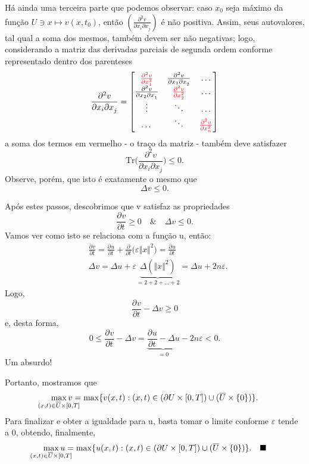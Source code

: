 \documentclass[../pde_notes.tex]{subfiles}
\begin{document}
\begin{proof*}
	Há ainda uma terceira parte que podemos observar: caso \(x_{0}\) seja máximo da função \(U\ni x\mapsto v(x, t_{0})\), então
	\(
	\left(\frac{\partial^{2}v}{\partial x_{i}\partial x_{j}^{}}\right)
	\)
	é não positiva. Assim, seus autovalores, tal qual a soma dos mesmos, também devem ser não negativas; logo, considerando a matriz das derivadas parciais de segunda ordem conforme representado dentro dos parenteses
	\[
		\frac{\partial^{2}v}{\partial x_{i}\partial x_{j}^{}} = \begin{bmatrix}
			{\color{red}\frac{\partial^{2}v}{\partial x_{1}^{2}}} & \frac{\partial^{2}v}{\partial x_{1}\partial x_{2}^{}} & \dotsc                                                \\
			\frac{\partial^{2}v}{\partial x_{2}\partial x_{1}^{}} & {\color{red}\frac{\partial^{2}v}{\partial x_{2}^{2}}} & \dotsc                                                \\
			\vdots                                                & \ddots                                                & \dotsc                                                \\
			\dotsc                                                & \ddots                                                & {\color{red}\frac{\partial^{2}v}{\partial x_{n}^{2}}}
		\end{bmatrix}
	\]
	a soma dos termos em vermelho - o traço da matriz - também deve satisfazer
	\[
		\mathrm{Tr}\biggl(\frac{\partial^{2}v}{\partial x_{i}\partial x_{j}^{}}\biggr) \leq 0.
	\]
	Observe, porém, que isto é exatamente o mesmo que
	\[
		\Delta v \leq 0.
	\]

	Após estes passos, descobrimos que v satisfaz as propriedades
	\[
		\frac{\partial^{}v}{\partial t^{}}\geq 0 \quad\&\quad \Delta v \leq 0.
	\]
	Vamos ver como isto se relaciona com a função u, então:
	\begin{align*}
		 & \frac{\partial^{}v}{\partial t^{}}=\frac{\partial^{}u}{\partial t^{}}+\frac{\partial^{}}{\partial t^{}}\bigl(\varepsilon \Vert x \Vert^{2}\bigr) = \frac{\partial^{}u}{\partial t^{}} \\
		 & \Delta v = \Delta u + \varepsilon \underbrace{\Delta \left(\Vert x \Vert^{2}\right)}_{=2+2+\dotsc +2} = \Delta u + 2n\varepsilon.
	\end{align*}
	Logo,
	\[
		\frac{\partial^{}v}{\partial t^{}}-\Delta v \geq 0
	\]
	e, desta forma,
	\[
		0\leq \frac{\partial^{}v}{\partial t^{}}-\Delta v = \underbrace{\frac{\partial^{}u}{\partial t^{}}-\Delta u }_{=0}-2n\varepsilon < 0.
	\]
	Um absurdo!

	Portanto, mostramos que
	\[
		\max_{\mathclap{(x, t)\in \overline{U}\times [0,T]}}v =\max_{}\{v(x, t):(x, t)\in(\partial U\times [0,T])\cup (\overline{U}\times \{0\})\}.
	\]
	Para finalizar e obter a igualdade para u, basta tomar o limite conforme \(\varepsilon \) tende a 0, obtendo, finalmente,
	\[
		\max_{\mathclap{(x, t)\in \overline{U}\times [0,T]}}u =\max_{}\{u(x, t):(x, t)\in(\partial U\times [0,T])\cup (\overline{U}\times \{0\})\}.\quad \text{\qedsymbol}
	\]
\end{proof*}
\end{document}
